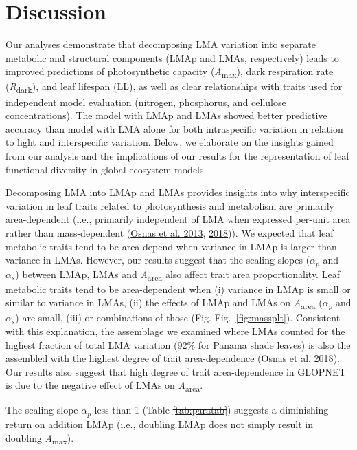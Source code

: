 \documentclass[
  12pt,
  a4paper,
,tablecaptionabove
]{scrartcl}
\providecommand{\DIFaddtex}[1]{{\protect\color{blue}\uwave{#1}}} %
\providecommand{\DIFdeltex}[1]{{\protect\color{red}\sout{#1}}}                      %
\providecommand{\DIFaddbegin}{} %
\providecommand{\DIFaddend}{} %
\providecommand{\DIFdelbegin}{} %
\providecommand{\DIFdelend}{} %
\providecommand{\DIFadd}[1]{\texorpdfstring{\DIFaddtex{#1}}{#1}} %
\providecommand{\DIFdel}[1]{\texorpdfstring{\DIFdeltex{#1}}{}} %
\newcommand{\DIFscaledelfig}{0.5}
\newlength{\DIFdelgraphicswidth} %
\newlength{\DIFdelgraphicsheight} %
\newcommand{\DIFaddincludegraphics}[2][]{{\color{blue}\fbox{\DIFOincludegraphics[#1]{#2}}}} %
\newcommand{\DIFdelincludegraphics}[2][]{%
\sbox{\DIFdelgraphicsbox}{\DIFOincludegraphics[#1]{#2}}%
\settoboxwidth{\DIFdelgraphicswidth}{\DIFdelgraphicsbox} %
\settoboxtotalheight{\DIFdelgraphicsheight}{\DIFdelgraphicsbox} %
\scalebox{\DIFscaledelfig}{%
\parbox[b]{\DIFdelgraphicswidth}{\usebox{\DIFdelgraphicsbox}\\[-\baselineskip] \rule{\DIFdelgraphicswidth}{0em}}\llap{\resizebox{\DIFdelgraphicswidth}{\DIFdelgraphicsheight}{%
\setlength{\unitlength}{\DIFdelgraphicswidth}%
\begin{picture}(1,1)%
\thicklines\linethickness{2pt} %
{\color[rgb]{1,0,0}\put(0,0){\framebox(1,1){}}}%
{\color[rgb]{1,0,0}\put(0,0){\line( 1,1){1}}}%
{\color[rgb]{1,0,0}\put(0,1){\line(1,-1){1}}}%
\end{picture}%
}\hspace*{3pt}}} %
} %
\DeclareRobustCommand{\DIFaddbegin}{\DIFOaddbegin \let\includegraphics\DIFaddincludegraphics} %
\DeclareRobustCommand{\DIFaddend}{\DIFOaddend \let\includegraphics\DIFOincludegraphics} %
\DeclareRobustCommand{\DIFdelbegin}{\DIFOdelbegin \let\includegraphics\DIFdelincludegraphics} %
\DeclareRobustCommand{\DIFdelend}{\DIFOaddend \let\includegraphics\DIFOincludegraphics} %
\begin{document}
\hypertarget{discussion}{%
\section{Discussion}\label{discussion}}

Our analyses demonstrate that decomposing LMA variation into separate metabolic and structural components (LMAp and LMAs, respectively) leads to improved predictions of photosynthetic capacity (\emph{A}\textsubscript{max}), dark respiration rate (\emph{R}\textsubscript{dark}), and leaf lifespan (LL), as well as clear relationships with traits used for independent model evaluation (nitrogen, phosphorus, and cellulose concentrations).
The model with LMAp and LMAs showed better predictive accuracy than model with LMA alone for both intraspecific variation in relation to light and interspecific variation.
Below, we elaborate on the insights gained from our analysis and the implications of our results for the representation of leaf functional diversity in global ecosystem models.

Decomposing LMA into LMAp and LMAs provides insights into why interspecific variation in leaf traits related to photosynthesis and metabolism are primarily area-dependent (i.e., primarily independent of LMA when expressed per-unit area rather than mass-dependent (\protect\hyperlink{ref-Osnas2013}{Osnas et al. 2013}, \protect\hyperlink{ref-Osnas2018}{2018})).
We expected that leaf metabolic traits tend to be area-depend when variance in LMAp is larger than variance in LMAs.
However, our results suggest that the scaling slopes (\(\alpha_p\) and \(\alpha_s\)) between LMAp, LMAs and \emph{A}\textsubscript{area} also affect trait area proportionality.
Leaf metabolic traits tend to be area-dependent when (i) variance in LMAp is small or similar to variance in LMAs, (ii) the effects of LMAp and LMAs on \emph{A}\textsubscript{area} (\(\alpha_p\) and \(\alpha_s\)) are small, (iii) or combinations of those (Fig. Fig.~\ref{fig:massplt}).
Consistent with this explanation, the assemblage we examined where LMAs counted for the highest fraction of total LMA variation (92\% for Panama shade leaves) is also the assembled with the highest degree of trait area-dependence (\protect\hyperlink{ref-Osnas2018}{Osnas et al. 2018}).
Our results also suggest that high degree of trait area-dependence in GLOPNET is due to the negative effect of LMAs on \emph{A}\textsubscript{area}.

The scaling slope \(\alpha_p\) less than 1 (Table \DIFdelbegin \DIFdel{\ref{tab:paratab}}\DIFdelend \DIFaddbegin \DIFadd{2}\DIFaddend ) suggests a diminishing return on addition LMAp (i.e., doubling LMAp does not simply result in doubling \emph{A}\textsubscript{max}).
\end{document}
